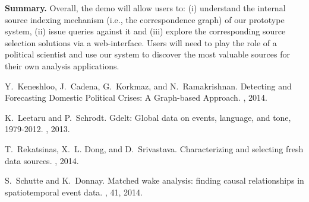 \documentclass{sig-alternate}
\begin{document}
\vspace{3pt}\noindent\textbf{Summary.} Overall, the demo will allow users to: (i) understand the internal source indexing mechanism (i.e., the correspondence graph) of our prototype system, (ii) issue queries against it and (iii) explore the corresponding source selection solutions via a web-interface. Users will need to play the role of a political scientist and use our system to discover the most valuable sources for their own analysis applications.
 \balance

\begin{thebibliography}{10}

Y.~Keneshloo, J.~Cadena, G.~Korkmaz, and N.~Ramakrishnan.
\newblock Detecting and Forecasting Domestic Political Crises: A Graph-based Approach.
, 2014.

K.~Leetaru and P.~Schrodt.
\newblock Gdelt: Global data on events, language, and tone, 1979-2012.
, 2013.

T.~Rekatsinas, X.~L. Dong, and D.~Srivastava.
\newblock Characterizing and selecting fresh data sources.
, 2014.

S.~Schutte and K.~Donnay.
\newblock Matched wake analysis: finding causal relationships in spatiotemporal
  event data.
, 41, 2014.


\end{thebibliography}
\end{document}
